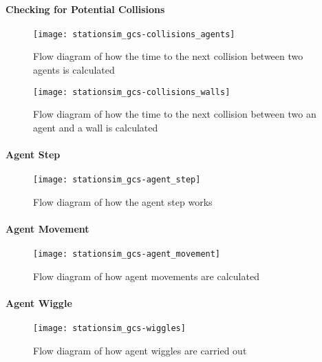 \paragraph{Checking for Potential Collisions}\label{para:submodels:collisions}

\begin{figure}[h]
    \centering
    \texttt{[image: stationsim\_gcs-collisions\_agents]}
    \caption{Flow diagram of how the time to the next collision between two
    agents is calculated}\label{fig:flow:agent_collisions}
\end{figure}

\begin{figure}[h]
    \centering
    \texttt{[image: stationsim\_gcs-collisions\_walls]}
    \caption{Flow diagram of how the time to the next collision between two an
    agent and a wall is calculated}\label{fig:flow:wall_collisions}
\end{figure}

\paragraph{Agent Step}\label{para:submodels:agent_step}

\begin{figure}[h]
    \centering
    \texttt{[image: stationsim\_gcs-agent\_step]}
    \caption{Flow diagram of how the agent step
    works}\label{fig:flow:agent_step}
\end{figure}

\paragraph{Agent Movement}\label{para:submodels:agent_movement}

\begin{figure}[h]
    \centering
    \texttt{[image: stationsim\_gcs-agent\_movement]}
    \caption{Flow diagram of how agent movements are
    calculated}\label{fig:flow:agent_movement}
\end{figure}

\paragraph{Agent Wiggle}\label{para:submodels:agent_wiggle}

\begin{figure}[h]
    \centering
    \texttt{[image: stationsim\_gcs-wiggles]}
    \caption{Flow diagram of how agent wiggles are carried
    out}\label{fig:flow:agent_wiggles}
\end{figure}

